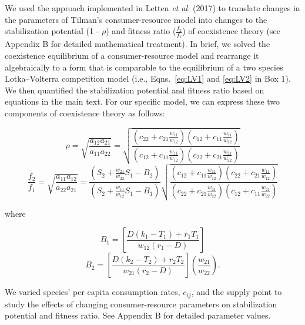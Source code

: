 We used the approach implemented in Letten \textit{et al.} (2017) to translate changes in the parameters of Tilman's consumer-resource model \citep{tilman1982} into changes to the stabilization potential (1 - $\rho$) and fitness ratio ($\frac{f_{2}}{f_{1}}$) of coexistence theory (see Appendix B for detailed mathematical treatment). In brief, we solved the coexistence equilibrium of a consumer-resource model and rearrange it algebraically to a form that is comparable to the equilibrium of a two species Lotka--Volterra competition model (i.e., Eqns.~\ref{eq:LV1} and \ref{eq:LV2} in Box 1). We then quantified the stabilization potential and fitness ratio based on equations in the main text. For our specific model, we can express these two components of coexistence theory as follows: 

\begin{equation}
\rho  = \sqrt {\frac{{{a_{12}}{a_{21}}}}{{{a_{11}}{a_{22}}}}}  = \sqrt {\frac{\left (
		c_{22} + c_{21}\frac{w_{11}}{w_{12}}\right )\left ( 
		c_{12} + c_{11}\frac{w_{21}}{w_{22}} \right )}{\left (
		c_{12} + c_{11}\frac{w_{11}}{w_{12}}\right )\left ( 
		c_{22} + c_{21}\frac{w_{21}}{w_{22}} \right )}}
\tag{3.11}\label{eq:3.11}
\end{equation}
\begin{equation}
\frac{{{f_2}}}{{{f_1}}} = \sqrt {\frac{{{a_{11}}{a_{12}}}}{{{a_{22}}{a_{21}}}}}  = \frac{\left (S_{2}+\frac{w_{21}}{w_{22}}S_{1}-B_{2}\right )}{\left (S_{2}+\frac{w_{11}}{w_{12}}S_{1}-B_{1}\right )}\sqrt {\frac{\left (
				c_{12} + c_{11}\frac{w_{11}}{w_{12}}\right )\left ( 
				c_{22} + c_{21}\frac{w_{11}}{w_{12}} \right )}{\left (
				c_{22} + c_{21}\frac{w_{21}}{w_{22}}\right )\left ( 
				c_{12} + c_{11}\frac{w_{21}}{w_{22}} \right )}}
\tag{3.12}\label{eq:3.12}
\end{equation} 
				
where 

\begin{equation}
{B_1} = \left[ {\frac{{D\left( {{k_1} - {T_1}} \right) + {r_1}{T_1}}}{{{w_{12}}\left( {{r_1} - D} \right)}}} \right]
\tag{3.13}\label{eq:3.13}
\end{equation} 
\begin{equation}
{B_2} = \left[ {\frac{{D\left( {{k_2} - {T_2}} \right) + {r_2}{T_2}}}{{{w_{21}}\left( {{r_2} - D} \right)}}} \right]\left( {\frac{{{w_{21}}}}{{{w_{22}}}}} \right).
\tag{3.14}\label{eq:3.14}
\end{equation} 

\noindent We varied species' per capita consumption rates, $c_{ij}$, and the supply point to study the effects of changing consumer-resource parameters on stabilization potential and fitness ratio. See Appendix B for detailed parameter values. 
\par
	
